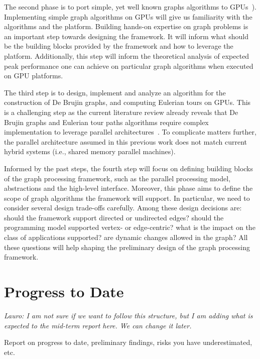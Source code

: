 \documentclass{acm_proc_article-sp}[12pt]
\begin{document}
The second phase is to port simple, yet well known graphs 
algorithms to
GPUs~\cite{Meyer2003,Harish2007,Malewicz2009,Sungpack2010}). Implementing
simple graph algorithms on GPUs will give us familiarity with the
algorithms and the platform. Building hands-on expertise on graph
problems is an important step towards designing the framework. It will
inform what should be the building blocks provided by the framework
and how to leverage the platform. Additionally, this step will inform
the theoretical analysis of expected peak performance one can achieve
on particular graph algorithms when executed on GPU platforms.

The third step is to design, implement and analyze an algorithm for the
construction of De Brujin graphs, and computing Eulerian tours on
GPUs. This is a challenging step as the current literature review
already reveals that De Brujin graphs and Eulerian tour paths
algorithms require complex implementation to leverage parallel
architectures~\cite{Quinn1984,Atallah1984}. To complicate matters
further, the parallel architecture assumed in this previous work
does not match current hybrid systems (i.e., shared memory parallel
machines).

Informed by the past steps, the fourth step will focus on defining
building blocks of the graph processing framework, such as the
parallel processing model, abstractions and the high-level
interface. Moreover, this phase aims to define the scope of graph
algorithms the framework will support. In particular, we need to
consider several design trade-offs carefully. Among these design
decisions are: should the framework support directed or undirected
edges? should the programming model supported vertex- or edge-centric?
what is the impact on the class of applications supported? are dynamic
changes allowed in the graph? All these questions will help shaping
the preliminary design of the graph processing framework.

\section{Progress to Date}
\label{sec:progress}

{\em Lauro: I am not sure if we want to follow this structure, but
I am adding what is expected to the mid-term report here. We can change it later.}

Report on progress to date, preliminary findings, risks you have
underestimated, etc.
\end{document}
